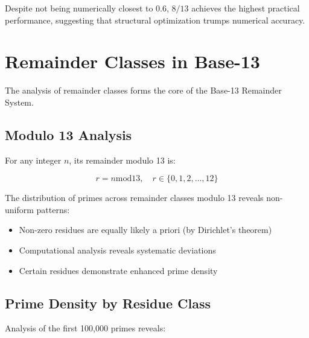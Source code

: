 \documentclass[12pt,a4paper]{report}
\newcommand{\remainderOp}{\text{mod}}
\begin{document}
Despite not being numerically closest to 0.6, $8/13$ achieves the highest practical performance, suggesting that structural optimization trumps numerical accuracy.

\section{Remainder Classes in Base-13}

The analysis of remainder classes forms the core of the Base-13 Remainder System.

\subsection{Modulo 13 Analysis}

For any integer $n$, its remainder modulo 13 is:

\[
r = n \remainderOp 13, \quad r \in \{0, 1, 2, \ldots, 12\}
\]

The distribution of primes across remainder classes modulo 13 reveals non-uniform patterns:

\begin{itemize}
\item Non-zero residues are equally likely a priori (by Dirichlet's theorem)
\item Computational analysis reveals systematic deviations
\item Certain residues demonstrate enhanced prime density
\end{itemize}

\subsection{Prime Density by Residue Class}

Analysis of the first 100,000 primes reveals:
\end{document}
